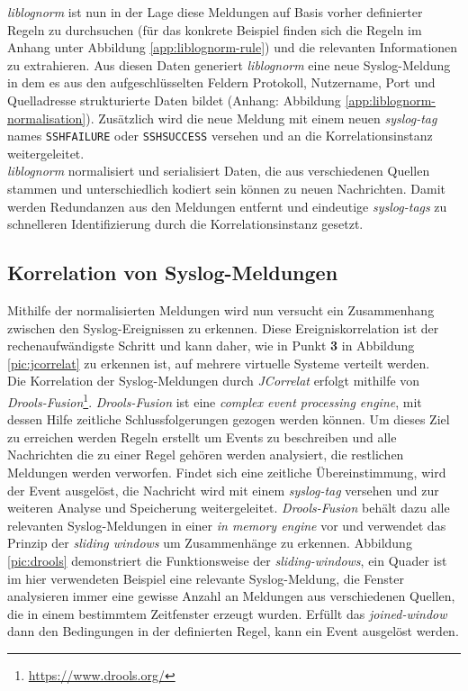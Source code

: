 \textit{liblognorm} ist nun in der Lage diese Meldungen auf Basis vorher definierter 
Regeln zu durchsuchen (für das konkrete Beispiel finden sich die Regeln im Anhang unter 
Abbildung \ref{app:liblognorm-rule}) und die relevanten Informationen zu extrahieren.  
Aus diesen Daten generiert \textit{liblognorm} eine neue Syslog-Meldung in dem es aus den 
aufgeschlüsselten Feldern Protokoll, Nutzername, Port und Quelladresse strukturierte 
Daten bildet (Anhang: Abbildung \ref{app:liblognorm-normalisation}). Zusätzlich wird die 
neue Meldung mit einem neuen \textit{syslog-tag} names \texttt{SSHFAILURE} oder 
\texttt{SSHSUCCESS} versehen und an die Korrelationsinstanz weitergeleitet.\\

\textit{liblognorm} normalisiert und serialisiert Daten, die aus verschiedenen Quellen 
stammen und unterschiedlich kodiert sein können zu neuen Nachrichten. Damit werden 
Redundanzen aus den Meldungen entfernt und eindeutige \textit{syslog-tags} zu schnelleren 
Identifizierung durch die Korrelationsinstanz gesetzt. 


\newpage

\subsection{Korrelation von Syslog-Meldungen}\label{syslog-korrelation}

Mithilfe der normalisierten Meldungen wird nun versucht ein Zusammenhang zwischen den 
Syslog-Ereignissen zu erkennen. Diese Ereigniskorrelation ist der rechenaufwändigste 
Schritt und kann daher, wie in Punkt \textbf{3} in Abbildung \ref{pic:jcorrelat} zu 
erkennen ist, auf mehrere virtuelle Systeme verteilt werden.\\

Die Korrelation der Syslog-Meldungen durch \textit{JCorrelat} erfolgt mithilfe von 
\textit{Drools-Fusion}\footnote{\url{https://www.drools.org/}}. \textit{Drools-Fusion} 
ist eine \textit{complex event processing engine}, mit dessen Hilfe zeitliche 
Schlussfolgerungen gezogen werden können. Um dieses Ziel zu erreichen werden Regeln 
erstellt um Events zu beschreiben und alle Nachrichten die zu einer Regel 
gehören werden analysiert, die restlichen Meldungen werden verworfen. Findet sich eine 
zeitliche Übereinstimmung, wird der Event ausgelöst, die 
Nachricht wird mit einem \textit{syslog-tag} versehen und zur weiteren Analyse und 
Speicherung  weitergeleitet. \textit{Drools-Fusion} behält dazu alle relevanten 
Syslog-Meldungen in einer \textit{in memory engine} vor und verwendet das Prinzip der 
\textit{sliding windows} um Zusammenhänge zu erkennen. Abbildung \ref{pic:drools} 
\cite[70]{drools-slide} demonstriert die Funktionsweise der \textit{sliding-windows}, ein 
Quader ist im hier verwendeten Beispiel eine relevante Syslog-Meldung, die Fenster 
analysieren immer eine gewisse Anzahl an Meldungen aus verschiedenen Quellen, die in 
einem bestimmtem Zeitfenster erzeugt wurden. Erfüllt das \textit{joined-window} dann den 
Bedingungen in der definierten Regel, kann ein Event ausgelöst werden.    

